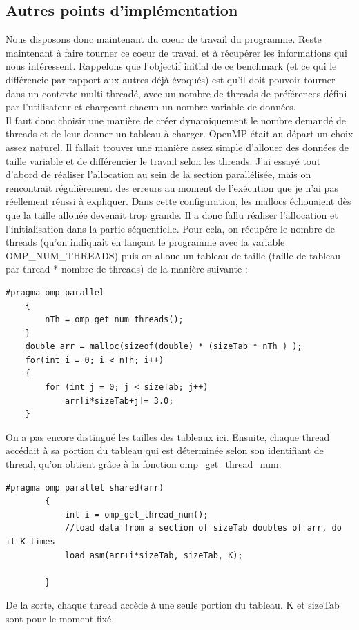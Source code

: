 \documentclass{report}
\begin{document}
\subsection{Autres points d'implémentation}
Nous disposons donc maintenant du coeur de travail du programme. Reste maintenant à faire tourner
ce coeur de travail et à récupérer les informations qui nous intéressent. Rappelons que l'objectif initial
de ce benchmark (et ce qui le différencie par rapport aux autres déjà évoqués) est qu'il doit pouvoir
tourner dans un contexte multi-threadé, avec un nombre de threads de préférences défini par l'utilisateur
et chargeant chacun un nombre variable de données. 
\\Il faut donc choisir une manière de créer dynamiquement le nombre demandé de threads et de leur donner
un tableau à charger. OpenMP était au départ un choix assez naturel. Il fallait trouver une manière
assez simple d'allouer des données de taille variable et de différencier le travail selon les threads.
J'ai essayé tout d'abord de réaliser l'allocation au sein de la section parallélisée, mais on rencontrait
régulièrement des erreurs au moment de l'exécution que je n'ai pas réellement réussi à expliquer. Dans
cette configuration, les mallocs échouaient dès que la taille allouée devenait trop grande. Il a donc
fallu réaliser l'allocation et l'initialisation dans la partie séquentielle. Pour cela, on récupére
le nombre de threads (qu'on indiquait en lançant le programme avec la variable 
OMP\_NUM\_THREADS) puis on alloue un tableau de taille (taille de tableau par thread *
nombre de threads) de la manière suivante : 
\begin{lstlisting}
#pragma omp parallel
	{
		nTh = omp_get_num_threads();
	}
	double arr = malloc(sizeof(double) * (sizeTab * nTh ) );
	for(int i = 0; i < nTh; i++)
	{
		for (int j = 0; j < sizeTab; j++)
			arr[i*sizeTab+j]= 3.0;
	}
\end{lstlisting}
On a pas encore distingué les tailles des tableaux ici. Ensuite, chaque thread accédait à sa portion
du tableau qui est déterminée selon son identifiant de thread, qu'on obtient grâce à la fonction
omp\_get\_thread\_num.
\begin{lstlisting}
#pragma omp parallel shared(arr)
		{
			int i = omp_get_thread_num();
			//load data from a section of sizeTab doubles of arr, do it K times
			load_asm(arr+i*sizeTab, sizeTab, K);

		}
\end{lstlisting}
De la sorte, chaque thread accède à une seule portion du tableau. K et sizeTab sont pour le moment fixé.
\end{document}
